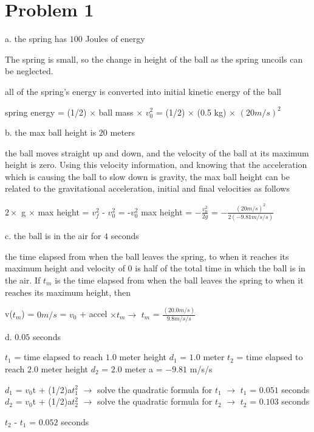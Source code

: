 \chapter{Problem 1}
\label{Problem 1}
a. the spring has $100$ Joules of energy

The spring is small, so the change in height of the ball as the spring uncoils can be neglected.

all of the spring's energy is converted into initial kinetic energy of the ball

spring energy = (1/2) $\times$ ball mass $\times$ $v_{0}^{2}$
			  = (1/2) $\times$ (0.5 kg) $\times$ $(20 m/s)^{2}$


b. the max ball height is $20$ meters

the ball moves straight up and down, and the velocity of the ball at its maximum height is zero.
Using this velocity information, and knowing that the acceleration which is causing the ball
to slow down is gravity, the max ball height can be related to the gravitational acceleration,
initial and final velocities as follows

$2 \times$ g $\times$ max height = $v_{f}^{2}$ - $v_{0}^{2}$ = -$v_{0}^{2}$
max height = $ -\frac{v_{0}^{2}}{2g} $ = $-\frac{(20 m/s)^{2}}{2(-9.81 m/s/s)}$


c. the ball is in the air for $4$ seconds

the time elapsed from when the ball leaves the spring, to when it reaches its maximum height
and velocity of $0$ is half of the total time in which the ball is in the air.
If $t_{m}$ is the time elapsed from when the ball leaves the spring to when it reaches its
maximum height, then

v($t_{m}$) = $0 m/s$ = $v_{0}$ + accel $\times t_{m} \rightarrow$ $t_{m}$ = $\frac{(20.0 m/s)}{9.8 m/s/s}$


d. $0.05$ seconds

$t_{1}$ = time elapsed to reach $1.0$ meter height   $d_{1}$ = $1.0$ meter
$t_{2}$ = time elapsed to reach $2.0$ meter height   $d_{2}$ = $2.0$ meter
a = $-9.81$ m/s/s

$d_{1}$ = $v_{0}$t + (1/2)a$t_{1}^{2}$ $\rightarrow$ solve the quadratic formula for $t_{1}$ $\rightarrow$ $t_{1}$ = $0.051$ seconds
$d_{2}$ = $v_{0}$t + (1/2)a$t_{2}^{2}$ $\rightarrow$ solve the quadratic formula for $t_{2}$ $\rightarrow$ $t_{2}$ = $0.103$ seconds

$t_{2}$ - $t_{1}$ = $0.052$ seconds

